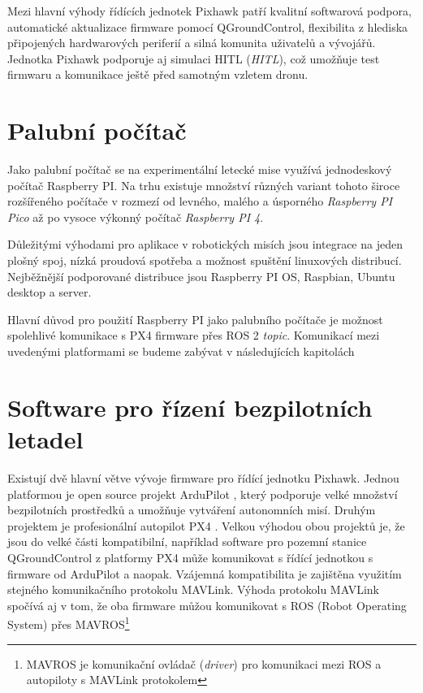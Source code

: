 Mezi hlavní výhody řídících jednotek Pixhawk patří kvalitní softwarová podpora, automatické aktualizace firmware pomocí QGroundControl, flexibilita z hlediska připojených hardwarových periferií a silná komunita uživatelů a vývojářů. Jednotka Pixhawk podporuje aj simulaci \acs{HITL} (\textit{\acl{HITL}}), což umožňuje test firmwaru a komunikace ještě před samotným vzletem dronu.

\section{Palubní počítač}

Jako palubní počítač se na experimentální letecké mise využívá jednodeskový počítač Raspberry PI. Na trhu existuje množství různých variant tohoto široce rozšířeného počítače v rozmezí od levného, malého a úsporného  \textit{Raspberry PI Pico} až po vysoce výkonný počítač \textit{Raspberry PI 4}.

Důležitými výhodami pro aplikace v robotických misích jsou integrace na jeden plošný spoj, nízká proudová spotřeba a možnost spuštění linuxových distribucí. Nejběžnější podporované distribuce jsou Raspberry PI OS, Raspbian, Ubuntu desktop a server.

Hlavní důvod pro použití Raspberry PI jako palubního počítače je možnost spolehlivé komunikace s PX4 firmware přes ROS 2 \textit{topic}. Komunikací mezi uvedenými platformami se budeme zabývat v následujících kapitolách

\section{Software pro řízení bezpilotních letadel}

Existují dvě hlavní větve vývoje firmware pro řídící jednotku Pixhawk. Jednou platformou je open source projekt ArduPilot \cite{ARDU}, který podporuje velké množství bezpilotních prostředků a umožňuje vytváření autonomních misí. Druhým projektem je profesionální autopilot PX4 \cite{PX4ORG}. Velkou výhodou obou projektů je, že jsou do velké části kompatibilní, například software pro pozemní stanice QGroundControl z platformy PX4 může komunikovat s řídící jednotkou s firmware od ArduPilot a naopak. Vzájemná kompatibilita je zajištěna využitím stejného komunikačního protokolu MAVLink. Výhoda protokolu MAVLink spočívá aj v tom, že oba firmware můžou komunikovat s ROS (Robot Operating System) přes MAVROS\footnote{MAVROS je komunikační ovládač (\textit{driver}) pro komunikaci mezi ROS a autopiloty s MAVLink protokolem}


